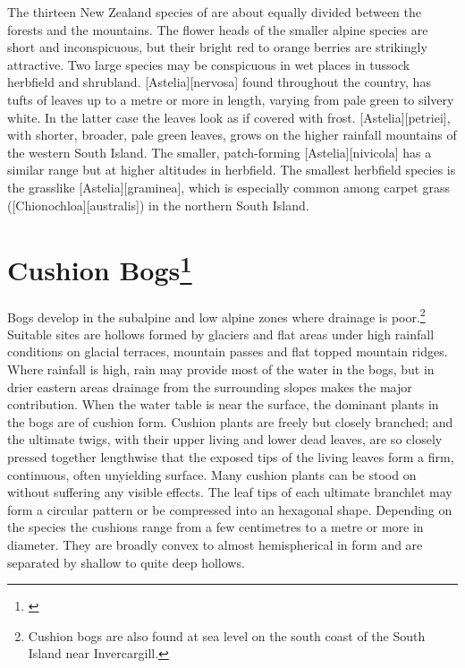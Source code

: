 The thirteen New Zealand species of  are about equally divided between the forests and the mountains.
The flower heads of the smaller alpine species are short and inconspicuous, but their bright red to orange berries are strikingly attractive.
Two large species may be conspicuous in wet places in tussock herbfield and shrubland. [Astelia][nervosa] found throughout the country, has tufts of leaves up to a metre or more in length, varying from pale green to silvery white.
In the latter case the leaves look as if covered with frost. [Astelia][petriei], with shorter, broader, pale green leaves, grows on the higher rainfall mountains of the western South Island.
The smaller, patch-forming [Astelia][nivicola] has a similar range but at higher altitudes in herbfield.
The smallest herbfield species is the grasslike [Astelia][graminea], which is especially common among carpet grass ([Chionochloa][australis]) in the northern South Island.

\section[Cushion Bogs]{Cushion Bogs\thinspace\footnote{\cite{gibson1985comparison}}}

Bogs develop in the subalpine and low alpine zones where drainage is poor.\footnote{Cushion bogs are also found at sea level on the south coast of the South Island near Invercargill.}
Suitable sites are hollows formed by glaciers and flat areas under high rainfall conditions on glacial terraces, mountain passes and flat topped mountain ridges.
Where rainfall is high, rain may provide most of the water in the bogs, but in drier eastern areas drainage from the surrounding slopes makes the major contribution.
When the water table is near the surface, the dominant plants in the bogs are of cushion form.
Cushion plants are freely but closely branched; and the ultimate twigs, with their upper living and lower dead leaves, are so closely pressed together lengthwise that the exposed tips of the living leaves form a firm, continuous, often unyielding surface.
Many cushion plants can be stood on without suffering any visible effects.
The leaf tips of each ultimate branchlet may form a circular pattern or be compressed into an hexagonal shape.
Depending on the species the cushions range from a few centimetres to a metre or more in diameter.
They are broadly convex to almost hemispherical in form and are separated by shallow to quite deep hollows.

